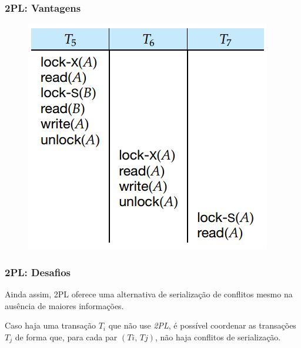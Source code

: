 \documentclass{beamer}
\begin{document}
\begin{frame} %
    \frametitle{2PL: Vantagens}

    \begin{figure}
        \includegraphics[width=0.6\linewidth]{example2.png}
    \end{figure}

\end{frame}







\begin{frame} %
    \frametitle{2PL: Desafios}

    Ainda assim, 2PL oferece uma alternativa de serialização de conflitos mesmo na ausência de maiores informações. 

    \medskip
    \begin{theorem}[Serialização do 2PL]
        Caso haja uma transação \(T_{i}\) que não use \emph{2PL}, é possível coordenar as transações \(T_{j}\) de forma que, para cada par \( (Ti, \, Tj)\), não haja conflitos de serialização.
    \end{theorem}

    \medskip
\end{frame}
\end{document}

